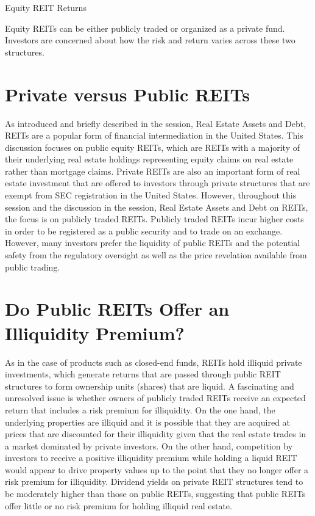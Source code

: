 \documentclass[11pt]{article}
\begin{document}
Equity REIT Returns

Equity REITs can be either publicly traded or organized as a private fund. Investors are concerned about how the risk and return varies across these two structures.

\section*{Private versus Public REITs}
As introduced and briefly described in the session, Real Estate Assets and Debt, REITs are a popular form of financial intermediation in the United States. This discussion focuses on public equity REITs, which are REITs with a majority of their underlying real estate holdings representing equity claims on real estate rather than mortgage claims. Private REITs are also an important form of real estate investment that are offered to investors through private structures that are exempt from SEC registration in the United States. However, throughout this session and the discussion in the session, Real Estate Assets and Debt on REITs, the focus is on publicly traded REITs. Publicly traded REITs incur higher costs in order to be registered as a public security and to trade on an exchange. However, many investors prefer the liquidity of public REITs and the potential safety from the regulatory oversight as well as the price revelation available from public trading.

\section*{Do Public REITs Offer an Illiquidity Premium?}
As in the case of products such as closed-end funds, REITs hold illiquid private investments, which generate returns that are passed through public REIT structures to form ownership units (shares) that are liquid. A fascinating and unresolved issue is whether owners of publicly traded REITs receive an expected return that includes a risk premium for illiquidity. On the one hand, the underlying properties are illiquid and it is possible that they are acquired at prices that are discounted for their illiquidity given that the real estate trades in a market dominated by private investors. On the other hand, competition by investors to receive a positive illiquidity premium while holding a liquid REIT would appear to drive property values up to the point that they no longer offer a risk premium for illiquidity. Dividend yields on private REIT structures tend to be moderately higher than those on public REITs, suggesting that public REITs offer little or no risk premium for holding illiquid real estate.
\end{document}
